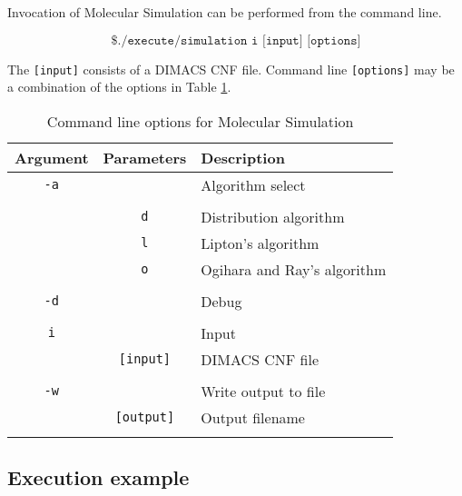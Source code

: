 Invocation of Molecular Simulation can be performed from the command line.

\[
\texttt{\$ ./execute/simulation i [input] [options]}
\]

The \texttt{[input]} consists of a DIMACS CNF file.  Command line \texttt{[options]} may be a combination of the options in Table \ref{MolecularCommandLineArgs}.

\begin{table}[htdp]
\caption{Command line options for Molecular Simulation}
\begin{center}
\begin{tabular}{|c|c|l|}
\hline
\textbf{Argument} & \textbf{Parameters} & \textbf{Description} \\ \hline
 \texttt{-a}	& 				   & Algorithm select \\
  				&				   &		 \\
 				& \texttt{d}	   & Distribution algorithm		 \\
 				& \texttt{l}	   & Lipton's algorithm		 \\
 				& \texttt{o}	   & Ogihara and Ray's algorithm		 \\
 				&				   &		 \\ \hline 				
\texttt{-d}		&				   & Debug		 \\ 				
 				&				   &		 \\ \hline
\texttt{i}		&				   & Input		 \\ 				
				& \texttt{[input]} & DIMACS CNF file		 \\ 				
 				&				   &		 \\ \hline 				
\texttt{-w}		&				   & Write output to file		 \\
 				& \texttt{[output]} & Output filename \\
 				&				   &		 \\ \hline 				
\end{tabular}
\end{center}
\label{MolecularCommandLineArgs}
\end{table}%

\FloatBarrier

\subsection{Execution example}

